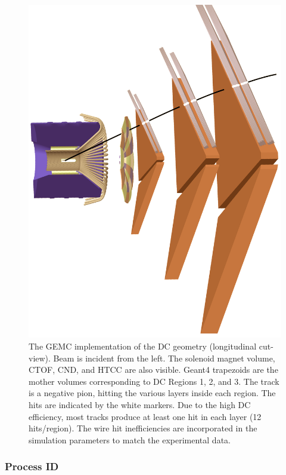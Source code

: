 \begin{figure}[h]
	\centering
	\includegraphics[width=0.99\columnwidth,keepaspectratio]{img/dcGeometry.png}
	\caption{The GEMC implementation of the DC geometry (longitudinal cut-view). Beam is incident from the left. The
          solenoid magnet volume, CTOF, CND, and HTCC are also visible. Geant4 trapezoids are the mother volumes
          corresponding to DC Regions 1, 2, and 3. The track is a negative pion, hitting the various layers inside each region.
          The hits are indicated by the white markers. Due to the high DC efficiency, most tracks produce at least one hit in
          each layer (12 hits/region). The wire hit inefficiencies are incorporated in the simulation parameters to match the
          experimental data.}
	\label{fig:dcGeometry}
\end{figure}

\subsubsection{Process ID}


